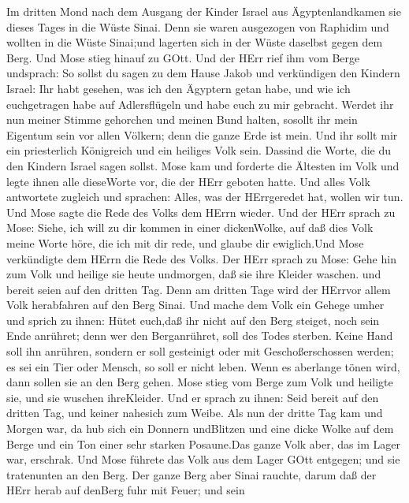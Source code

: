  Im dritten Mond nach dem Ausgang der Kinder Israel aus
Ägyptenlandkamen sie dieses Tages in die Wüste Sinai.  Denn
sie waren ausgezogen von Raphidim und wollten in die Wüste Sinai;und
lagerten sich in der Wüste daselbst gegen dem Berg.  Und
Mose stieg hinauf zu GOtt. Und der HErr rief ihm vom Berge undsprach: So
sollst du sagen zu dem Hause Jakob und verkündigen den Kindern Israel:
 Ihr habt gesehen, was ich den Ägyptern getan habe, und wie
ich euchgetragen habe auf Adlersflügeln und habe euch zu mir gebracht.
 Werdet ihr nun meiner Stimme gehorchen und meinen Bund
halten, sosollt ihr mein Eigentum sein vor allen Völkern; denn die ganze
Erde ist mein.  Und ihr sollt mir ein priesterlich
Königreich und ein heiliges Volk sein. Dassind die Worte, die du den
Kindern Israel sagen sollst.  Mose kam und forderte die
Ältesten im Volk und legte ihnen alle dieseWorte vor, die der HErr
geboten hatte.  Und alles Volk antwortete zugleich und
sprachen: Alles, was der HErrgeredet hat, wollen wir tun. Und Mose sagte
die Rede des Volks dem HErrn wieder.  Und der HErr sprach zu
Mose: Siehe, ich will zu dir kommen in einer dickenWolke, auf daß dies
Volk meine Worte höre, die ich mit dir rede, und glaube dir ewiglich.Und
Mose verkündigte dem HErrn die Rede des Volks.  Der HErr
sprach zu Mose: Gehe hin zum Volk und heilige sie heute undmorgen, daß
sie ihre Kleider waschen.  und bereit seien auf den dritten
Tag. Denn am dritten Tage wird der HErrvor allem Volk herabfahren auf
den Berg Sinai.  Und mache dem Volk ein Gehege umher und
sprich zu ihnen: Hütet euch,daß ihr nicht auf den Berg steiget, noch
sein Ende anrühret; denn wer den Berganrühret, soll des Todes sterben.
 Keine Hand soll ihn anrühren, sondern er soll gesteinigt
oder mit Geschoßerschossen werden; es sei ein Tier oder Mensch, so soll
er nicht leben. Wenn es aberlange tönen wird, dann sollen sie an den
Berg gehen.  Mose stieg vom Berge zum Volk und heiligte
sie, und sie wuschen ihreKleider.  Und er sprach zu ihnen:
Seid bereit auf den dritten Tag, und keiner nahesich zum Weibe.
 Als nun der dritte Tag kam und Morgen war, da hub sich ein
Donnern undBlitzen und eine dicke Wolke auf dem Berge und ein Ton einer
sehr starken Posaune.Das ganze Volk aber, das im Lager war, erschrak.
 Und Mose führete das Volk aus dem Lager GOtt entgegen; und
sie tratenunten an den Berg.  Der ganze Berg aber Sinai
rauchte, darum daß der HErr herab auf denBerg fuhr mit Feuer; und sein

